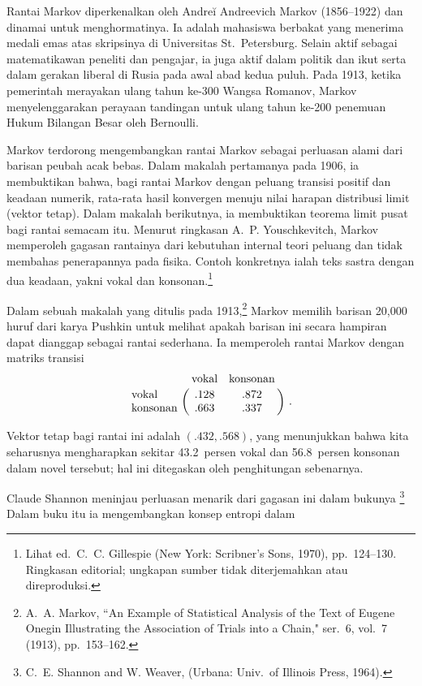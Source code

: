 Rantai Markov diperkenalkan oleh Andre\u i Andreevich Markov (1856--1922) dan dinamai untuk menghormatinya. Ia adalah mahasiswa berbakat
yang menerima medali emas atas skripsinya di Universitas St.~Petersburg. Selain
aktif sebagai matematikawan peneliti dan pengajar, ia juga aktif dalam politik
dan ikut serta dalam gerakan liberal di Rusia pada awal abad kedua puluh. Pada
1913, ketika pemerintah merayakan ulang tahun ke-300 Wangsa Romanov, Markov
menyelenggarakan perayaan tandingan untuk ulang tahun ke-200 penemuan Hukum
Bilangan Besar oleh Bernoulli.
\par
Markov terdorong mengembangkan rantai Markov sebagai perluasan alami dari
barisan peubah acak bebas. Dalam makalah pertamanya pada 1906, ia membuktikan
bahwa, bagi rantai Markov dengan peluang transisi positif dan keadaan numerik,
rata-rata hasil konvergen menuju nilai harapan distribusi limit (vektor tetap).
Dalam makalah berikutnya, ia membuktikan teorema limit pusat bagi rantai semacam
itu. Menurut ringkasan A.~P. Youschkevitch, Markov memperoleh gagasan rantainya dari
kebutuhan internal teori peluang dan tidak membahas penerapannya pada fisika. Contoh
konkretnya ialah teks sastra dengan dua keadaan, yakni vokal dan konsonan.\footnote{Lihat
 ed.~C.~C. Gillespie (New York: Scribner's
Sons, 1970), pp.~124--130. Ringkasan editorial; ungkapan sumber tidak diterjemahkan
atau direproduksi.}
\par
Dalam sebuah makalah yang ditulis pada 1913,\footnote{A.~A. Markov, ``An Example of Statistical
Analysis of the Text of Eugene Onegin Illustrating the Association of Trials
into a Chain,"  ser.~6, vol.~7 (1913), pp.~153--162.} Markov memilih barisan
20{,}000 huruf dari  karya Pushkin untuk
melihat apakah barisan ini secara hampiran dapat dianggap sebagai rantai
sederhana. Ia memperoleh rantai Markov dengan matriks transisi
$$
\bordermatrix{
& \mbox{vokal} & \mbox{konsonan} \cr
\mbox{vokal} & .128 & .872 \cr
\mbox{konsonan} & .663 & .337}\ .
$$
\par
Vektor tetap bagi rantai ini adalah $(.432, .568)$, yang menunjukkan bahwa kita
seharusnya mengharapkan sekitar 43.2~persen vokal dan 56.8~persen konsonan dalam
novel tersebut; hal ini ditegaskan oleh penghitungan sebenarnya.
\par
Claude Shannon meninjau perluasan menarik dari gagasan ini dalam bukunya \footnote{C.~E.
Shannon and W. Weaver,  (Urbana:
Univ.\ of
Illinois Press, 1964).} Dalam buku itu ia mengembangkan konsep entropi dalam
